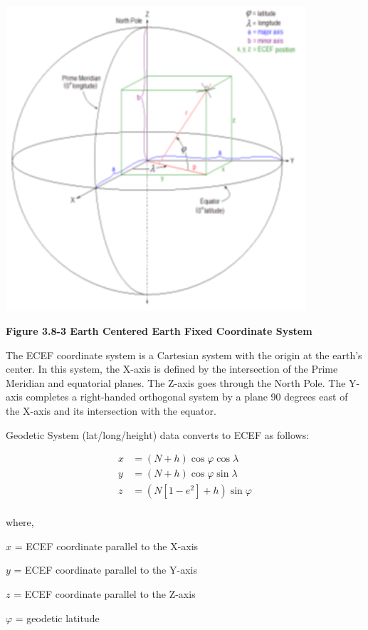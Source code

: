 \documentclass[
]{book}
\begin{document}
\includegraphics[width=4.37408in,height=4.46226in]{media/03/image31.png}

\textbf{Figure 3.8-3 Earth Centered Earth Fixed Coordinate System}

The ECEF coordinate system is a Cartesian system with the origin at the earth's center. In this system, the X-axis is defined by the intersection of the Prime Meridian and equatorial planes. The Z-axis goes through the North Pole. The Y-axis completes a right-handed orthogonal system by a plane 90 degrees east of the X-axis and its intersection with the equator.

Geodetic System (lat/long/height) data converts to ECEF as follows:

\begin{align}
x &= \left(N + h \right)\cos{\varphi}\cos{\lambda} \\
y &= \left(N + h \right)\cos{\varphi}\sin{\lambda} \\
z &= \left(N \left[ 1-e^2 \right] + h \right) \sin{\varphi} \\
\end{align}

where,

\(x\) = ECEF coordinate parallel to the X-axis

\(y\) = ECEF coordinate parallel to the Y-axis

\(z\) = ECEF coordinate parallel to the Z-axis

\(\varphi\) = geodetic latitude
\end{document}
